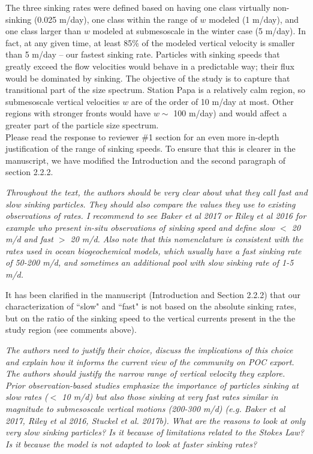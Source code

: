 \documentclass[12pt,letter]{article}
\begin{document}
{\color{blue}
	The three sinking rates were defined based on having one class virtually non-sinking (0.025 m/day), one class within the range of $w$ modeled (1 m/day), and one class larger than $w$ modeled at submesoscale in the winter case (5 m/day). In fact, at any given time, at least 85\% of the modeled vertical velocity is smaller than 5 m/day -- our fastest sinking rate.
	Particles with sinking speeds that greatly exceed the flow velocities would behave in a predictable way; their flux would be dominated by sinking.  The objective of the study is to capture that transitional part of the size spectrum. Station Papa is a relatively calm region, so submesoscale vertical velocities $w$ are of the order of 10 m/day at most. Other regions with stronger fronts would have $w\sim$ 100 m/day) and would affect a greater part of the particle size spectrum.\\

Please read the response to reviewer \#1 section for an even more in-depth justification of the range of sinking speeds. To ensure that this is clearer in the manuscript, we have modified the Introduction and the second paragraph of section 2.2.2.\\}

\textit{Throughout the text, the authors should be very clear about what they call fast and slow sinking particles. They should also compare the values they use to existing observations of rates. I recommend to see Baker et al 2017 or Riley et al 2016 for example who present in-situ observations of sinking speed and define slow $<$ 20 m/d and fast $>$ 20 m/d. Also note that this nomenclature is consistent with the rates used in ocean biogeochemical models, which usually have a fast sinking rate of 50-200 m/d, and sometimes an additional pool with slow sinking rate of 1-5 m/d.}

{\color{blue}
	It has been clarified in the manuscript (Introduction and Section 2.2.2) that our  characterization of ``slow" and ``fast" is not based on the absolute sinking rates, but on the ratio of the sinking speed to the vertical currents present in the the study region (see comments above).\\}

\textit{The authors need to justify their choice, discuss the implications of this choice and explain how it informs the current view of the community on POC export. The authors should justify the narrow range of vertical velocity they explore. Prior observation-based studies emphasize the importance of particles sinking at slow rates ($<$ 10 m/d) but also those sinking at very fast rates similar in magnitude to submesoscale vertical motions (200-300 m/d) (e.g. Baker et al 2017, Riley et al 2016, Stuckel et al. 2017b). What are the reasons to look at only very slow sinking particles? Is it because of limitations related to the Stokes Law? Is it because the model is not adapted to look at faster sinking rates?}
\end{document}
